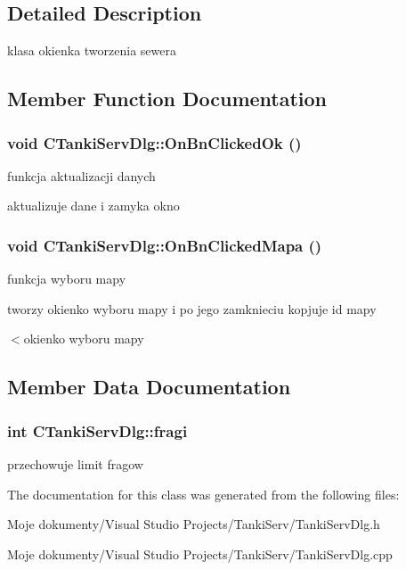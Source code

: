 \subsection{Detailed Description}
klasa okienka tworzenia sewera 



\subsection{Member Function Documentation}
\subsubsection{\setlength{\rightskip}{0pt plus 5cm}void CTankiServDlg::OnBnClickedOk ()}\label{class_c_tanki_serv_dlg_55bb236112cd91efb9cecf403254ecd6}


funkcja aktualizacji danych 

aktualizuje dane i zamyka okno 
\subsubsection{\setlength{\rightskip}{0pt plus 5cm}void CTankiServDlg::OnBnClickedMapa ()}\label{class_c_tanki_serv_dlg_f256cdbd6a5533732c2d707bb6683532}


funkcja wyboru mapy 

tworzy okienko wyboru mapy i po jego zamknieciu kopjuje id mapy 

$<$okienko wyboru mapy 

\subsection{Member Data Documentation}
\subsubsection{\setlength{\rightskip}{0pt plus 5cm}int {\bf CTankiServDlg::fragi}}\label{class_c_tanki_serv_dlg_e46d9560d9185195bb30d21a012ae63b}


przechowuje limit fragow 

The documentation for this class was generated from the following files:\begin{CompactItemize}
\item 
Moje dokumenty/Visual Studio Projects/TankiServ/TankiServDlg.h\item 
Moje dokumenty/Visual Studio Projects/TankiServ/TankiServDlg.cpp\end{CompactItemize}
